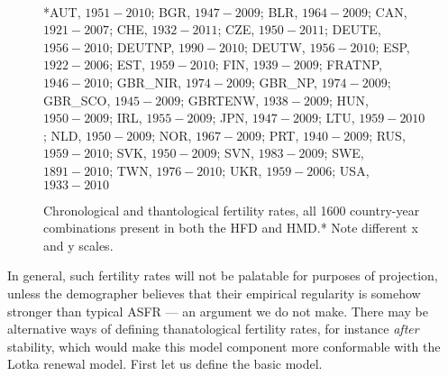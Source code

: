 \documentclass{article}
\begin{document}
\begin{figure}[h!]
	\caption{Chronological and thantological fertility rates, all 1600
	country-year combinations present in both the HFD and HMD.* Note different x
	and y scales.}
	\label{fig:Fxcompare}
	\begin{center}
	\\
	\end{center}
	\begin{tiny}
	*AUT, $1951-2010$; BGR, $1947-2009$; BLR, $1964-2009$; CAN, $1921-2007$; 
	CHE, $1932-2011$; CZE, $1950-2011$; DEUTE, $1956-2010$; DEUTNP, $1990-2010$; 
	DEUTW, $1956-2010$; ESP, $1922-2006$; EST, $1959-2010$; FIN, $1939-2009$; 
	FRATNP, $1946-2010$; GBR\_NIR, $1974-2009$; GBR\_NP, $1974-2009$; GBR\_SCO,
	$1945-2009$; GBRTENW, $1938-2009$; HUN, $1950-2009$; IRL, $1955-2009$; JPN, $1947-2009$; 
	LTU, $1959-2010$; NLD, $1950-2009$; NOR, $1967-2009$; PRT, $1940-2009$; 
	RUS, $1959-2010$; SVK, $1950-2009$; SVN, $1983-2009$; SWE, $1891-2010$; 
	TWN, $1976-2010$; UKR, $1959-2006$; USA, $1933-2010$
	\end{tiny}
\end{figure}

In general, such fertility rates will not be palatable for purposes of
projection, unless the demographer believes that their empirical regularity is
somehow stronger than typical ASFR --- an argument we do not make. There may be
alternative ways of defining thanatological fertility rates, for instance
\textit{after} stability, which would make this model component more conformable
with the Lotka renewal model. First let us define the basic model.
\end{document}
